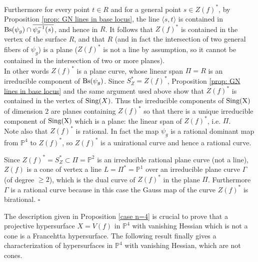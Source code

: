 \documentclass[11pt,a4paper]{amsart}
\newcommand{\eprf}{\hfill $\square$ \bigskip\par}
\begin{document}
Furthermore for every point $t\in R$ and for a general point $s\in
Z(f)^*$, by Proposition \ref{prop: GN lines in base locus}, the
line $\langle {s}, {t}\rangle$ is contained in ${\rm
Bs}(\psi_g)\cap\overline{\psi_g ^{-1}({s})}$, and hence in $R$. It
follows that $Z(f)^*$ is contained in the vertex of the surface
$R$, and that $R$ (and in fact the intersection of two general
fibers of $\psi_g$) is a plane  ($Z(f)^*$ is not a
line by assumption, so it  cannot be contained in the intersection  of two or more planes).\\
In other words  $Z(f)^*$ is a plane curve, whose linear span
$\Pi=R$ is an irreducible component of ${\rm Bs}(\psi_g)$. Since
$S^*_Z=Z(f)^*$, Proposition \ref{prop: GN lines in base locus} and
the same argument used above show that $Z(f)^*$ is contained in
the vertex of ${\rm Sing}(X)$. Thus the irreducible components of
${\rm Sing(X)}$ of dimension 2 are planes containing $Z(f)^*$ so
that there is a unique irreducible component of ${\rm Sing(X)}$
which is
a plane: the linear span of $Z(f)^*$, i.e. $\Pi$.\\
Note also that $Z(f)^*$  is rational. In fact the map $\psi_g$ is
a rational dominant map from $\mathbb{P}^4$ to $Z(f)^*$, so
$Z(f)^*$ is a unirational curve and hence a rational curve.

Since $Z(f)^*=S^*_Z\subset \Pi =\mathbb{P}^2$ is an irreducible
rational plane curve (not a line),  $Z(f)$ is a cone of vertex a
line $L=\Pi^*=\mathbb{P}^1$ over an irreducible plane curve
$\Gamma$ (of degree $\geq 2$), which is the dual curve of $Z(f)^*$
in the plane $\Pi$. Furthermore $\Gamma$ is  a rational curve
because in this case the Gauss map of the curve ${Z(f)^*}$ is
birational. \eprf

The description given in Proposition \ref{case n=4} is crucial to
prove that a projective hypersurface $X=V(f)$ in $\mathbb{P}^4$
with vanishing Hessian which is not a cone is a Francehtta
hypersurface. The following result finally gives a
characterization of hypersurfaces in $\mathbb{P}^4$ with vanishing
Hessian, which are not cones.
\end{document}
